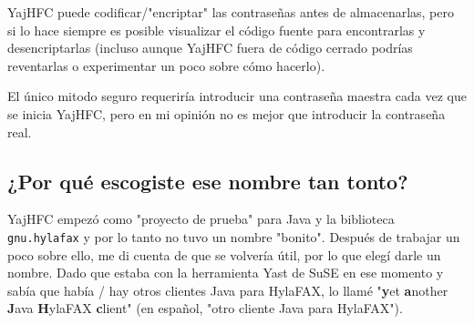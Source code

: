 \documentclass[a4paper,10pt]{scrartcl}
\begin{document}
YajHFC puede codificar/"encriptar" las contraseñas antes de almacenarlas, 
pero si lo hace siempre es posible visualizar el código fuente para encontrarlas 
y desencriptarlas (incluso aunque YajHFC fuera de código cerrado podrías reventarlas o experimentar un poco sobre cómo hacerlo).


El único mitodo seguro requeriría introducir una contraseña maestra cada vez que se inicia YajHFC, pero en mi opinión no es mejor que introducir la contraseña real.


\subsection{¿Por qué escogiste ese nombre tan tonto?}

YajHFC empezó como "proyecto de prueba" para Java y la biblioteca \texttt{gnu.hylafax}
y por lo tanto no tuvo un nombre "bonito". Después de trabajar un poco sobre ello, me di cuenta de que se volvería útil, por lo que elegí darle un nombre.
Dado que estaba con la herramienta Yast de SuSE en ese momento y sabía 
que había / hay otros clientes Java para HylaFAX, lo llamé "\textbf{y}et \textbf{a}nother \textbf{J}ava \textbf{H}ylaFAX \textbf{c}lient" (en español, "otro cliente Java para HylaFAX").
 
\end{document}
